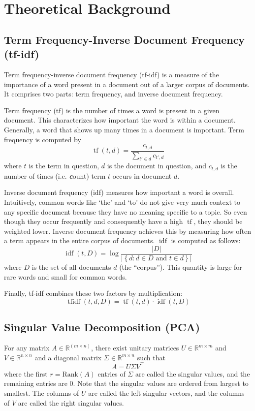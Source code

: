 \documentclass[11pt]{amsart}
\newcommand{\reals}{\mathbb{R}}
\newcommand{\tr}{\top}
\DeclareMathOperator{\tf}{tf}
\DeclareMathOperator{\idf}{idf}
\DeclareMathOperator{\tfidf}{tfidf}
\begin{document}
\section{Theoretical Background}\label{sec:theory}

\subsection*{Term Frequency-Inverse Document Frequency (tf-idf)}

Term frequency-inverse document frequency (tf-idf) is a measure of the
importance of a word present in a document out of a larger corpus of documents.
It comprises two parts: term frequency, and inverse document frequency.

Term frequency (tf) is the
number of times a word is present in a given document. This characterizes how
important the word is within a document. Generally, a word that shows up many
times in a document is important. Term frequency is computed by
\[ \tf(t, d) = \frac{c_{t, d}}{\sum_{t' \in d} c_{t', d}}\]
where \(t\) is the
term in question, \(d\) is the document in question, and \(c_{t, d}\) is the
number of times (i.e. \emph{\textbf{c}}ount) term \(t\) occurs in document \(d\).

Inverse document frequency (idf) measures how important a word is overall.
Intuitively, common words like `the' and `to' do not give very much context to
any specific document because they have no meaning specific to a topic. So even
though they occur frequently and consequently have a high \(\tf\), they should
be weighted lower. Inverse document frequency achieves this by measuring how
often a term appears in the entire corpus of documents. \(\idf\) is computed as follows:
\[ \idf(t, D) = \log \frac{|D|}{|\left\{ d : d \in D \text{ and } t \in
d\right\}|}\] where \(D\) is the set of all documents \(d\) (the ``corpus'').
This quantity is large for rare words and small for common words.

Finally, tf-idf combines these two factors by multiplication:
\[ \tfidf(t, d, D)  = \tf(t, d) \cdot \idf(t, D) \]

\subsection*{Singular Value Decomposition (PCA)}

For any matrix \(A \in \reals^(m\times n)\), there exist unitary matrices \(U
\in \reals^{m \times m}\)
and \(V \in \reals^{n \times n}\) and a diagonal matrix \(\Sigma \in \reals^{m
\times n}\) such that
\[ A = U \Sigma V^\tr \]
where the first \(r = \text{Rank}(A)\) entries of \(\Sigma\) are called the
singular values, and the remaining entries are 0. Note that the singular values
are ordered from largest to smallest. The columns of \(U\) are
called the left singular vectors, and the columns of \(V\) are called the right
singular values.
\end{document}

